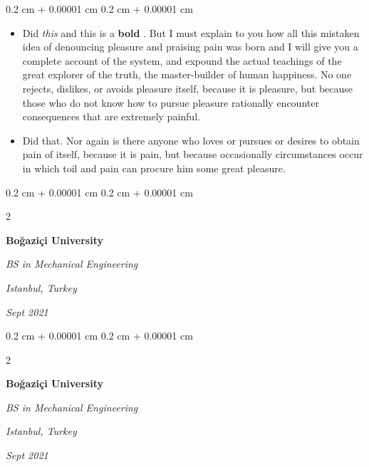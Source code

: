 \documentclass[10pt, letterpaper]{article}
\newenvironment{highlights}{
    \begin{itemize}[
        topsep=0.10 cm,
        parsep=0.10 cm,
        partopsep=0pt,
        itemsep=0pt,
        leftmargin=0.4 cm + 10pt
    ]
}{
    \end{itemize}
} %
\newenvironment{onecolentry}{
    \begin{adjustwidth}{
        0.2 cm + 0.00001 cm
    }{
        0.2 cm + 0.00001 cm
    }
}{
    \end{adjustwidth}
} %
\newenvironment{twocolentry}[2][]{
    \onecolentry
    \def\secondColumn{#2}
    \setcolumnwidth{\fill, 4.5 cm}
    \begin{paracol}{2}
}{
    \switchcolumn \raggedleft \secondColumn
    \end{paracol}
    \endonecolentry
} %
\let\hrefWithoutArrow\href
\renewcommand{\href}[2]{\hrefWithoutArrow{#1}{\ifthenelse{\equal{#2}{}}{ }{#2 }\raisebox{.15ex}{\footnotesize \faExternalLink*}}}
\begin{document}
        \vspace{0.10 cm}
        \begin{onecolentry}
            \begin{highlights}
                \item Did \textit{this} and this is a \textbf{bold} \href{https://example.com}{link}. But I must explain to you how all this mistaken idea of denouncing pleasure and praising pain was born and I will give you a complete account of the system, and expound the actual teachings of the great explorer of the truth, the master-builder of human happiness. No one rejects, dislikes, or avoids pleasure itself, because it is pleasure, but because those who do not know how to pursue pleasure rationally encounter consequences that are extremely painful.
                \item Did that. Nor again is there anyone who loves or pursues or desires to obtain pain of itself, because it is pain, but because occasionally circumstances occur in which toil and pain can procure him some great pleasure.
            \end{highlights}
        \end{onecolentry}


        \vspace{0.2 cm}

        \begin{twocolentry}{
        \textit{Istanbul, Turkey}    
            
        \textit{Sept 2021}}
            \textbf{Boğaziçi University}

            \textit{BS in Mechanical Engineering}
        \end{twocolentry}



        \vspace{0.2 cm}

        \begin{twocolentry}{
        \textit{Istanbul, Turkey}    
            
        \textit{Sept 2021}}
            \textbf{Boğaziçi University}

            \textit{BS in Mechanical Engineering}
        \end{twocolentry}
\end{document}
